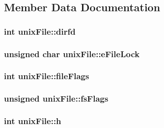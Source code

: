 \subsection{Member Data Documentation}
\hypertarget{structunix_file_aa4d81dba57e69451d4bc2c4593faaef6}{
\subsubsection[{dirfd}]{\setlength{\rightskip}{0pt plus 5cm}int unix\-File\-::dirfd}}\label{dd/d32/structunix_file_aa4d81dba57e69451d4bc2c4593faaef6}
\hypertarget{structunix_file_a001e59bdb9d3f396952c2c8e3229f7fc}{
\subsubsection[{e\-File\-Lock}]{\setlength{\rightskip}{0pt plus 5cm}unsigned char unix\-File\-::e\-File\-Lock}}\label{dd/d32/structunix_file_a001e59bdb9d3f396952c2c8e3229f7fc}
\hypertarget{structunix_file_a43e6df5096c2a58cb009b7c407f7cfeb}{
\subsubsection[{file\-Flags}]{\setlength{\rightskip}{0pt plus 5cm}int unix\-File\-::file\-Flags}}\label{dd/d32/structunix_file_a43e6df5096c2a58cb009b7c407f7cfeb}
\hypertarget{structunix_file_ab24cd99aef6872bdf36074ec00885993}{
\subsubsection[{fs\-Flags}]{\setlength{\rightskip}{0pt plus 5cm}unsigned unix\-File\-::fs\-Flags}}\label{dd/d32/structunix_file_ab24cd99aef6872bdf36074ec00885993}
\hypertarget{structunix_file_a1c58798d4ff3ac6232765c8b76bb7450}{
\subsubsection[{h}]{\setlength{\rightskip}{0pt plus 5cm}int unix\-File\-::h}}\label{dd/d32/structunix_file_a1c58798d4ff3ac6232765c8b76bb7450}
